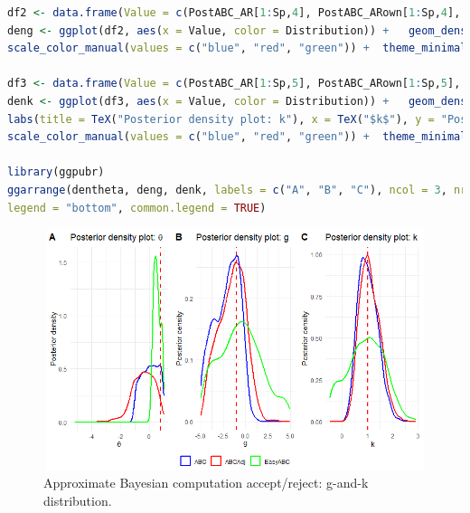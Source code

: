 \begin{enumerate}[leftmargin=*]
\begin{tcolorbox}[enhanced,width=4.67in,center upper,
	fontupper=\large\bfseries,drop shadow southwest,sharp corners]
\begin{VF}
\begin{lstlisting}[language=R]
df2 <- data.frame(Value = c(PostABC_AR[1:Sp,4], PostABC_ARown[1:Sp,4], PostABC_ARownRegAd[1:Sp,4]), Distribution = factor(c(rep("EasyABC", Sp), rep("ABC", Sp), rep("ABCAdj", Sp))))
deng <- ggplot(df2, aes(x = Value, color = Distribution)) +   geom_density(linewidth = 1) + geom_vline(xintercept = g, linetype = "dashed", color = "red", linewidth = 1) + labs(title = TeX("Posterior density plot: g"), x = TeX("$g$"), y = "Posterior density") +
scale_color_manual(values = c("blue", "red", "green")) +  theme_minimal() + theme(legend.title = element_blank())

df3 <- data.frame(Value = c(PostABC_AR[1:Sp,5], PostABC_ARown[1:Sp,5], PostABC_ARownRegAd[1:Sp,5]), Distribution = factor(c(rep("EasyABC", Sp), rep("ABC", Sp), rep("ABCAdj", Sp))))
denk <- ggplot(df3, aes(x = Value, color = Distribution)) +   geom_density(linewidth = 1) + geom_vline(xintercept = k, linetype = "dashed", color = "red", linewidth = 1) +
labs(title = TeX("Posterior density plot: k"), x = TeX("$k$"), y = "Posterior density") +
scale_color_manual(values = c("blue", "red", "green")) +  theme_minimal() + theme(legend.title = element_blank())

library(ggpubr)
ggarrange(dentheta, deng, denk, labels = c("A", "B", "C"), ncol = 3, nrow = 1,
legend = "bottom", common.legend = TRUE)
\end{lstlisting}
	\end{VF}
\end{tcolorbox}

\begin{figure}[!h]
	\includegraphics[width=340pt, height=200pt]{Chapters/chapter15/figures/ABCown.png}
	\caption[List of figure caption goes here]{Approximate Bayesian computation accept/reject: g-and-k distribution.}\label{figABCown}
\end{figure}

\end{enumerate}